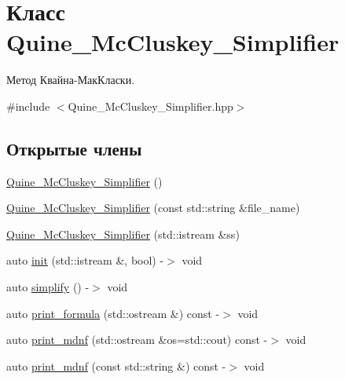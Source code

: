 \hypertarget{class_quine___mc_cluskey___simplifier}{}\section{Класс Quine\+\_\+\+Mc\+Cluskey\+\_\+\+Simplifier}
\label{class_quine___mc_cluskey___simplifier}


Метод Квайна-\/МакКласки.  




{\ttfamily \#include $<$Quine\+\_\+\+Mc\+Cluskey\+\_\+\+Simplifier.\+hpp$>$}

\subsection*{Открытые члены}
\begin{DoxyCompactItemize}
\item 
\hyperlink{class_quine___mc_cluskey___simplifier_afb4ade9f483e6e9c47168565c8d741e9}{Quine\+\_\+\+Mc\+Cluskey\+\_\+\+Simplifier} ()
\item 
\hyperlink{class_quine___mc_cluskey___simplifier_aa1349c798ddc66cbde37eb8ecfcf4ed3}{Quine\+\_\+\+Mc\+Cluskey\+\_\+\+Simplifier} (const std\+::string \&file\+\_\+name)
\item 
\hyperlink{class_quine___mc_cluskey___simplifier_a018ce5ad2b2a5175f3a26550310817a7}{Quine\+\_\+\+Mc\+Cluskey\+\_\+\+Simplifier} (std\+::istream \&ss)
\item 
auto \hyperlink{class_quine___mc_cluskey___simplifier_a4b27ad32a0403849166b9111f7d651fb}{init} (std\+::istream \&, bool) -\/$>$ void
\item 
auto \hyperlink{class_quine___mc_cluskey___simplifier_a0e238671acf06cbf2078c6ebc6ef1276}{simplify} () -\/$>$ void
\item 
auto \hyperlink{class_quine___mc_cluskey___simplifier_aa835e7ff9fcad0315af412b92e6c6579}{print\+\_\+formula} (std\+::ostream \&) const -\/$>$ void
\item 
auto \hyperlink{class_quine___mc_cluskey___simplifier_ad7097e7ae27b0baa1603a2726f6a33e3}{print\+\_\+mdnf} (std\+::ostream \&os=std\+::cout) const -\/$>$ void
\item 
auto \hyperlink{class_quine___mc_cluskey___simplifier_abf18d439c61c677f833a297caf64b6db}{print\+\_\+mdnf} (const std\+::string \&) const -\/$>$ void
\end{DoxyCompactItemize}
